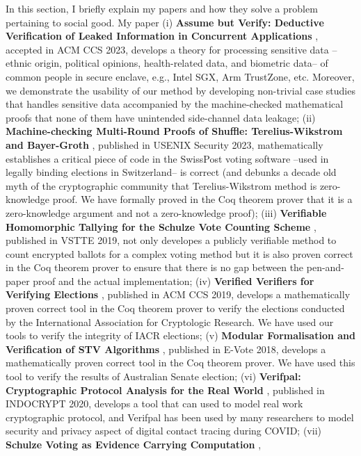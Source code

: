 \documentclass[12pt,a4paper]{article}
\begin{document}
In this section, I briefly explain my papers and how they solve a problem pertaining to social good.
My paper (i) \textbf{Assume but Verify: Deductive Verification of Leaked Information in Concurrent Applications} \cite{murrayassume},
accepted in ACM CCS 2023, develops a theory
for processing sensitive data --ethnic origin, political opinions,
health-related data, and  biometric data-- of common
people in secure enclave, e.g., Intel SGX, Arm TrustZone, etc. Moreover,
we demonstrate the usability of our method by developing non-trivial case studies that handles
sensitive data accompanied by the machine-checked mathematical proofs that none of
them have unintended side-channel data leakage;
(ii) \textbf{Machine-checking Multi-Round Proofs of Shuffle: Terelius-Wikstrom and Bayer-Groth} \cite{287095},
published in USENIX Security 2023, mathematically establishes a critical piece of
code in the SwissPost voting software --used in legally binding
elections in Switzerland-- is correct (and debunks a decade old myth of the cryptographic
community that Terelius-Wikstrom method is zero-knowledge proof. We have formally
proved in the Coq theorem prover that it is a zero-knowledge argument and not
a zero-knowledge proof);
(iii) \textbf{Verifiable Homomorphic Tallying for the Schulze Vote Counting Scheme} \cite{10.1007/978-3-030-41600-3_4}, published
in VSTTE 2019, not only developes a publicly verifiable method to count encrypted ballots for
a complex voting method but it
is also proven correct in the Coq theorem prover to ensure that there is no gap between
the pen-and-paper proof and the actual implementation;  (iv) \textbf{Verified Verifiers for
Verifying Elections} \cite{10.1145/3319535.3354247}, published in ACM CCS 2019, develops a mathematically proven correct tool
in the Coq theorem prover to verify the elections conducted by
the International Association for Cryptologic Research. We have used
our tools to verify the integrity of IACR elections; (v) \textbf{Modular Formalisation and
Verification of STV Algorithms} \cite{10.1007/978-3-030-00419-4_4}, published in E-Vote 2018, develops a mathematically proven
correct tool in the Coq theorem prover. We have used this tool to verify
the results of Australian Senate election;
(vi) \textbf{Verifpal: Cryptographic Protocol Analysis for the Real World} \cite{10.1007/978-3-030-65277-7_8}, published in
INDOCRYPT 2020, develops a tool that can used to model real work cryptographic protocol, and
Verifpal has been used by many researchers to model security and privacy aspect of
digital contact tracing during COVID; (vii) \textbf{Schulze Voting as Evidence Carrying Computation} \cite{10.1007/978-3-319-66107-0_26}, 
\end{document}
